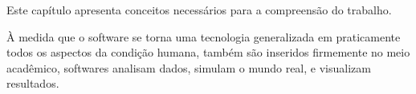 {Este capítulo apresenta conceitos necessários para a compreensão do trabalho.}
\label{fundamentacao}

À medida que o software se torna uma tecnologia generalizada em praticamente
todos os aspectos da condição humana, também são inseridos firmemente no meio
acadêmico, softwares analisam dados, simulam o mundo real, e visualizam
resultados.





